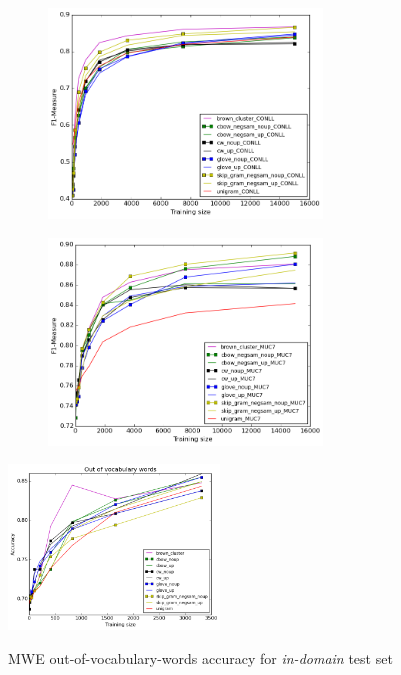 \begin{figure}
\caption{NER out-of-vocabulary-words accuracy for \textit{in-domain} and \textit{out-of-domain} test sets}
\centering
\begin{subfigure}{.5\textwidth}
	\centering
    	\includegraphics[width=0.8\textwidth]{plots/NERoutOfVocIN.png}
	\label{fig:inner}
\end{subfigure}
\begin{subfigure}{.5\textwidth}
	\centering
    	\includegraphics[width=0.8\textwidth]{plots/NERoutOfVocOUT.png}
	\label{fig:outner}
\end{subfigure}  	
\end{figure}


\begin{figure}
\caption{MWE out-of-vocabulary-words accuracy for \textit{in-domain} test set}
\centering
    	\includegraphics[width=0.5\textwidth]{plots/MWEoutOfVoc.png}    
\label{fig:outmwe}
\end{figure}

